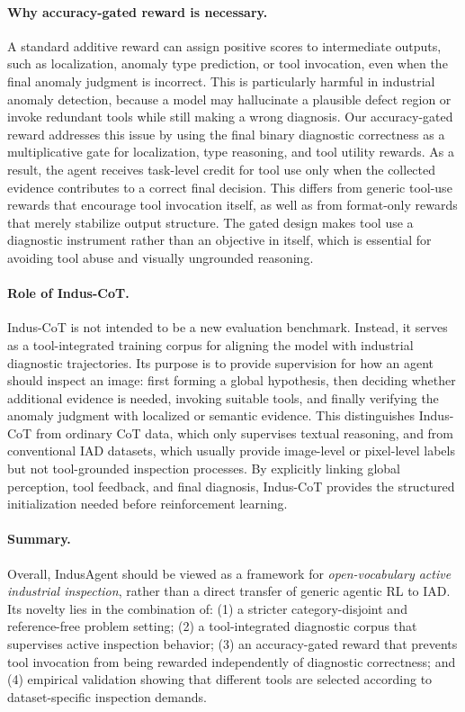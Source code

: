 \documentclass{article}
\begin{document}
{\paragraph{Why accuracy-gated reward is necessary.}
A standard additive reward can assign positive scores to intermediate outputs, such as localization, anomaly type prediction, or tool invocation, even when the final anomaly judgment is incorrect. 
This is particularly harmful in industrial anomaly detection, because a model may hallucinate a plausible defect region or invoke redundant tools while still making a wrong diagnosis. 
Our accuracy-gated reward addresses this issue by using the final binary diagnostic correctness as a multiplicative gate for localization, type reasoning, and tool utility rewards. 
As a result, the agent receives task-level credit for tool use only when the collected evidence contributes to a correct final decision. 
This differs from generic tool-use rewards that encourage tool invocation itself, as well as from format-only rewards that merely stabilize output structure. 
The gated design makes tool use a diagnostic instrument rather than an objective in itself, which is essential for avoiding tool abuse and visually ungrounded reasoning.

\paragraph{Role of Indus-CoT.}
Indus-CoT is not intended to be a new evaluation benchmark. 
Instead, it serves as a tool-integrated training corpus for aligning the model with industrial diagnostic trajectories. 
Its purpose is to provide supervision for how an agent should inspect an image: first forming a global hypothesis, then deciding whether additional evidence is needed, invoking suitable tools, and finally verifying the anomaly judgment with localized or semantic evidence. 
This distinguishes Indus-CoT from ordinary CoT data, which only supervises textual reasoning, and from conventional IAD datasets, which usually provide image-level or pixel-level labels but not tool-grounded inspection processes. 
By explicitly linking global perception, tool feedback, and final diagnosis, Indus-CoT provides the structured initialization needed before reinforcement learning.

\paragraph{Summary.}
Overall, IndusAgent should be viewed as a framework for \emph{open-vocabulary active industrial inspection}, rather than a direct transfer of generic agentic RL to IAD. 
Its novelty lies in the combination of: 
(1) a stricter category-disjoint and reference-free problem setting; 
(2) a tool-integrated diagnostic corpus that supervises active inspection behavior; 
(3) an accuracy-gated reward that prevents tool invocation from being rewarded independently of diagnostic correctness; and 
(4) empirical validation showing that different tools are selected according to dataset-specific inspection demands. 



}
\end{document}
